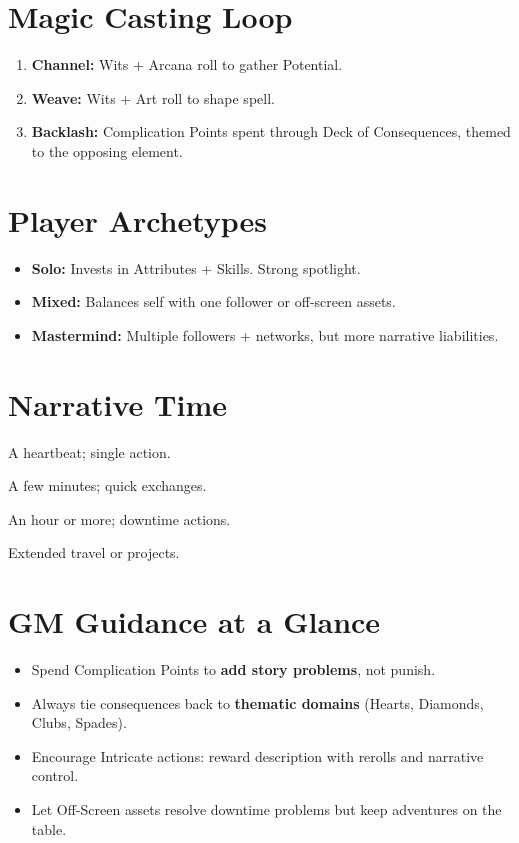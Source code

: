 \documentclass[12pt]{article}
\begin{document}
\section*{Magic Casting Loop}
\begin{enumerate}
  \item \textbf{Channel:} Wits + Arcana roll to gather Potential.  
  \item \textbf{Weave:} Wits + Art roll to shape spell.  
  \item \textbf{Backlash:} Complication Points spent through Deck of Consequences, themed to the opposing element.  
\end{enumerate}

\section*{Player Archetypes}
\begin{itemize}
  \item \textbf{Solo:} Invests in Attributes + Skills. Strong spotlight.  
  \item \textbf{Mixed:} Balances self with one follower or off-screen assets.  
  \item \textbf{Mastermind:} Multiple followers + networks, but more narrative liabilities.  
\end{itemize}

\section*{Narrative Time}
\begin{description}[leftmargin=2cm]
  \item[A Moment] A heartbeat; single action.  
  \item[Some Time] A few minutes; quick exchanges.  
  \item[Significant Time] An hour or more; downtime actions.  
  \item[Days] Extended travel or projects.  
\end{description}

\section*{GM Guidance at a Glance}
\begin{itemize}
  \item Spend Complication Points to \textbf{add story problems}, not punish.  
  \item Always tie consequences back to \textbf{thematic domains} (Hearts, Diamonds, Clubs, Spades).  
  \item Encourage Intricate actions: reward description with rerolls and narrative control.  
  \item Let Off-Screen assets resolve downtime problems but keep adventures on the table.  
\end{itemize}
\end{document}
